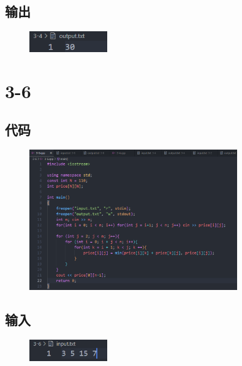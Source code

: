 \documentclass[11pt]{article}  %
\begin{document}
\subsection*{输出}

    \begin{figure}[H]
        \centering
        \includegraphics[width = 0.3\textwidth]{pic/3-4out.png}
    \end{figure}

\section*{3-6}

\subsection*{代码}

    \begin{figure}[H]
        \centering
        \includegraphics[width = 0.8\textwidth]{pic/3-6.png}
    \end{figure}

\subsection*{输入}

    \begin{figure}[H]
        \centering
        \includegraphics[width = 0.3\textwidth]{pic/3-6in.png}
    \end{figure}
\end{document}
